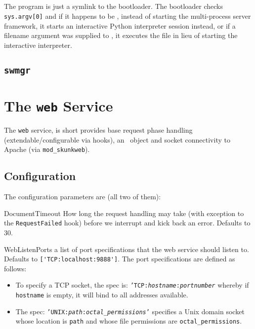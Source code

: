 \documentclass{manual}
\begin{document}
\section{\swpython}
The \swpython{} program is just a symlink to the bootloader.  The
bootloader checks \texttt{sys.argv[0]} and if it happens to be
\swpython{}, instead of starting the multi-process server framework,
it starts an interactive Python interpreter session instead, or if a
filename argument was supplied to \swpython{}, it executes the file in
lieu of starting the interactive interpreter.  
\index{\swpython}

\section{\texttt{swmgr}}

\chapter{The \texttt{web} Service}
The \texttt{web} service, is short provides base request phase
handling (extendable/configurable via hooks), an \connection\ object
and socket connectivity to 
Apache (via \texttt{mod\_skunkweb}).


\section{Configuration}

The configuration parameters are (all two of them):

\begin{datadesc}{DocumentTimeout} How long the request handling may 
take (with exception to the \texttt{RequestFailed} hook) before we
interrupt and kick back an error.  Defaults to 30. \nolocation
\end{datadesc}
\begin{datadesc}{WebListenPorts} 
a list of port specifications that the web service should listen to.
Defaults to \verb!['TCP:localhost:9888']!.  The port specifications
are defined as follows:
\begin{itemize}

\item To specify a TCP socket, the spec is:
\texttt{'TCP:\textit{hostname}:\textit{portnumber}} whereby if
\texttt{hostname} is empty, it will bind to all addresses available.
\item The spec:
\texttt{'UNIX:\textit{path}:\textit{octal\_permissions}'} specifies a
Unix domain socket whose location is \texttt{path} and whose file
permissions are \texttt{octal\_permissions}.
\end{itemize}
\nolocation
\end{datadesc}
\end{document}

